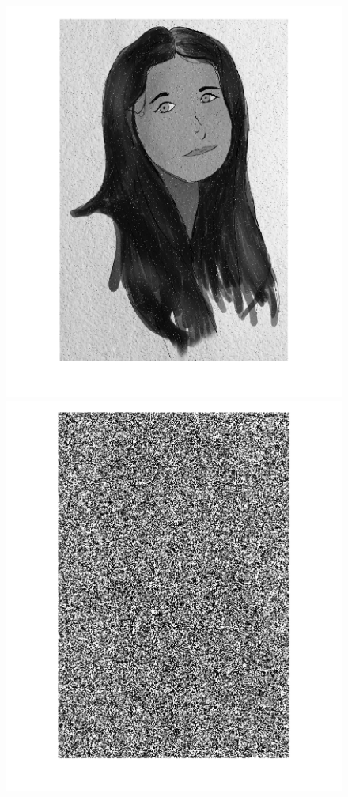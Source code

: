 \begin{figure}[htb] \centering
\includegraphics[scale=0.15,trim={3cm 0cm 3cm 0cm},clip]{Pictures/Esempi di utilizzo/Esempio 5/ami_originale_resize.png}
\includegraphics[scale=0.15,trim={3cm 0cm 3cm 0cm},clip]{Pictures/Esempi di utilizzo/Esempio 5/ami_calore_sigma2_deltat0_2_resize.png}

\end{figure}
